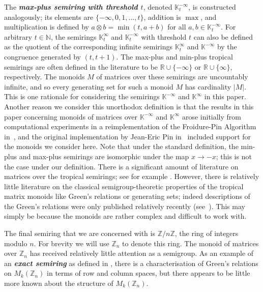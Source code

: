 \documentclass[11pt]{article}
\newcommand{\defn}[1]{\textbf{\textit{#1}}}
\numberwithin{equation}{section}
\renewcommand{\to}{\longrightarrow}
\newcommand{\N}{\mathbb{N}}
\newcommand{\Z}{\mathbb{Z}}
\newcommand{\K}{\mathbb{K}}
\newcommand{\Kmin}{\K^{\infty}}
\newcommand{\Kmint}{\K^{\infty}_t}
\newcommand{\Kmax}{\K^{-\infty}}
\newcommand{\Kmaxt}{\K^{-\infty}_t}
\begin{document}
The \defn{max-plus semiring with threshold $t$}, denoted $\Kmaxt$, is
constructed analogously; its elements are $\{-\infty, 0, 1, \ldots, t\}$,
addition is $\max$, and multiplication is defined by $a \otimes b = \min(t, a +
b)$ for all $a, b \in \Kmaxt$.
For arbitrary $t\in \N$, the semirings $\Kmint$ and $\Kmaxt$ with threshold $t$ can
also be defined as the quotient of the corresponding infinite semirings $\Kmint$
and $\Kmax$ by the congruence generated by $(t, t + 1)$.
The max-plus and min-plus tropical semirings are often defined in the literature
to be $\mathbb{R}\cup\{-\infty\}$ or $\mathbb{R}\cup\{\infty\}$, respectively.
The monoids $M$ of matrices over these semirings are uncountably infinite, and
so every generating set for such a monoid $M$ has cardinality $|M|$. This is one
rationale for considering the semirings $\Kmax$ and $\Kmin$ in this paper.
Another reason we consider this unorthodox definition is that the results in
this paper concerning monoids of matrices over $\Kmax$ and $\Kmin$ arose
initially from computational experiments in a reimplementation of the
Froidure-Pin Algorithm~\cite{Froidure1997aa, Semigroupe}
in~\cite{Libsemigroups}, and the original implementation by Jean-Eric Pin
in~\cite{Semigroupe} included support for the monoids we consider here.  Note
that under the standard definition, the min-plus and max-plus semirings are
isomorphic under the map $x \to -x$; this is not the case under our definition.
There is a significant amount of literature on matrices over the tropical
semirings; see for example \cite{Daviaud2018aa, Hollings2012aa, Izhakian2010aa,
  Johnson2013aa, Johnson2014aa, Johnson2019aa, Shitov2014aa, Simon1994aa}.
However, there is relatively little literature on the classical
semigroup-theoretic properties of the tropical matrix monoids like Green's
relations or generating sets; indeed descriptions of the Green's relations were
only published relatively recently (see~\cite{Hollings2012aa, Johnson2013aa}).
This may simply be because the monoids are rather complex and difficult to work
with.  

The final semiring that we are concerned with is $\Z / n\Z$, the ring of
integers modulo $n$. For brevity we will use $\Z_n$ to denote this ring.
The monoid of matrices over $\Z_n$ has received relatively little attention as a
semigroup. As an example of an \defn{exact semiring} as defined in
\cite{Wilding2013aa}, there is a characterisation of Green's relations on
$M_k(\Z_n)$ in terms of row and column spaces, but there appears to be little
more known about the structure of $M_k(\Z_n)$.
\end{document}
